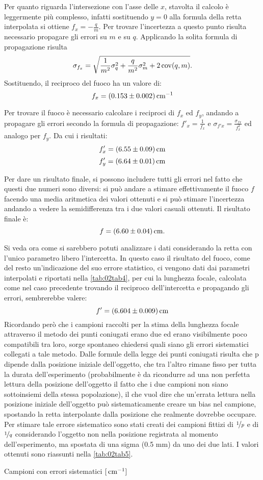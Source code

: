 Per quanto riguarda l'intersezione con l'asse delle $x$, stavolta il calcolo è leggermente più complesso, infatti sostituendo $y = 0$
 alla formula della retta interpolata si ottiene $f_x = -\frac{q}{m}$.  Per trovare l'incertezza a questo punto risulta necessario
 propagare gli errori su $m$ e su $q$. Applicando la solita formula di propagazione risulta
\[\sigma_{f_x} = \sqrt {\frac{1} {m^2} \sigma_q^2 + \frac{q}{m^2} \sigma_m^2 + 2 \operatorname{cov} (q,m) }.\] Sostituendo,
 il reciproco del fuoco ha un valore di:
\[f_x = (0.153 \pm 0.002) \,\mathrm{cm}^{-1}\]

Per trovare il fuoco è necessario calcolare i reciproci di $f_x$ ed $f_y$, andando a propagare gli errori secondo la formula di 
propagazione: $f'_x = \frac{1}{f_x}$ e $\sigma_{f'x} = \frac{\sigma_{fx}}{f_{x}^2}$ ed analogo per $f_y$. Da cui i risultati:
\[f'_x = (6.55 \pm 0.09) \,\mathrm{cm} \]
\[f'_y = (6.64 \pm 0.01) \,\mathrm{cm} \]

Per dare un risultato finale, si possono includere tutti gli errori nel fatto che questi due numeri sono diversi: si può andare a
 stimare effettivamente il fuoco $f$ facendo una media aritmetica dei valori ottenuti e si può stimare l'incertezza
 andando a vedere la
 semidifferenza tra i due valori casuali ottenuti. Il risultato finale è:
\[f = (6.60 \pm 0.04) \,\mathrm{cm} .\]

Si veda ora come si sarebbero potuti analizzare i dati considerando la retta con l'unico parametro libero l'intercetta. In questo
 caso il risultato del fuoco, come del resto un'indicazione del suo errore statistico, ci vengono dati dai parametri interpolati e
 riportati nella \autoref{tab:02tab4}, per cui la lunghezza focale, calcolata come nel caso precedente trovando il reciproco
 dell'intercetta e propagando gli errori, sembrerebbe valere:
\[f' = (6.604 \pm 0.009) \,\mathrm{cm} \]
Ricordando però che i campioni raccolti per la stima della lunghezza focale attraverso il metodo dei punti coniugati erano due ed
 erano visibilmente poco compatibili tra loro, sorge spontaneo chiedersi quali siano gli errori sistematici collegati a tale metodo.
 Dalle formule della legge dei punti coniugati risulta che p dipende dalla posizione iniziale dell'oggetto, che tra
 l'altro rimane fisso per tutta la durata dell'esperimento (probabilmente è da ricondurre ad una non perfetta lettura della posizione
 dell'oggetto il fatto che i due campioni non siano sottoinsiemi della stessa popolazione), il che vuol dire che un'errata lettura
 nella posizione iniziale dell'oggetto può sistematicamente creare un bias nel campione, spostando la retta interpolante dalla
 posizione che realmente dovrebbe occupare. Per stimare tale errore sistematico sono stati creati dei campioni fittizi di $\nicefrac{1}{p}$ e
 di $\nicefrac{1}{q}$ considerando l'oggetto non nella posizione registrata al momento dell'esperimento, ma spostata di una sigma (0.5 mm) da
 uno dei due lati. I valori ottenuti sono riassunti nella \autoref{tab:02tab5}.
\begin{tabella}
	\centering
	
	\caption{Campioni con errori sistematici $[\,\mathrm{cm}^{-1}]$}
	\label{tab:02tab5}
\end{tabella}

